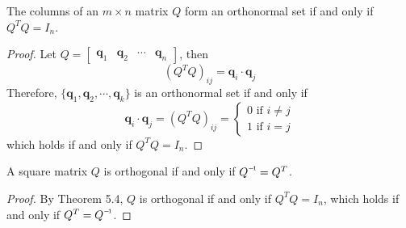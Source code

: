 \begin{theorem}
	The columns of an $m \times n$ matrix $Q$ form an orthonormal set if and only if $Q^TQ = I_n$.
\end{theorem}
\begin{proof}
	Let $Q = \begin{bmatrix}
		\textbf{q}_1 & \textbf{q}_2 & \cdots & \textbf{q}_n
	\end{bmatrix}$, then \begin{equation*}
		(Q^TQ)_{ij} = \textbf{q}_i \cdot \textbf{q}_j
	\end{equation*}
	Therefore, $\{\textbf{q}_1, \textbf{q}_2, \cdots, \textbf{q}_k \}$ is an orthonormal set if and only if \begin{equation*}
		\textbf{q}_i \cdot \textbf{q}_j = (Q^TQ)_{ij} = \begin{cases}
			0 \mbox{ if } i \neq j \\
			1 \mbox{ if } i = j
		\end{cases}
	\end{equation*}
	which holds if and only if $Q^TQ = I_n$.
\end{proof}

\begin{theorem}
	A square matrix $Q$ is orthogonal if and only if $\inv{Q} = Q^T$.
\end{theorem}
\begin{proof}
	By Theorem 5.4, $Q$ is orthogonal if and only if $Q^TQ = I_n$, which holds if and only if $Q^T = \inv{Q}$.
\end{proof}

